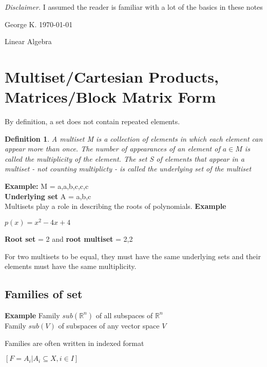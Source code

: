 \documentclass [12pt]{article}
\newtheorem {definition}{Definition}
\begin{document}
\thispagestyle {empty}

\color {blue} 
\tableofcontents 

\emph{Disclaimer.} I assumed the reader is familiar with a lot of the basics
in these notes \color {black} \newpage {}

\noindent George K. \hfill \today 

\begin {center}
 {\large Linear Algebra} 
\end {center}
 


\section {Multiset/Cartesian Products, Matrices/Block Matrix Form} By definition,
a set does not contain repeated elements. 
\begin {definition}
 A multiset M is a collection of elements in which each element can appear
more than once. The number of appearances of an element of $a\in M$ is called
the multiplicity of the element. The set S of elements that appear in a
multiset - not counting multiplicty - is called the underlying set of the
multiset 
\end {definition}
 

\textbf{Example:} M = {a,a,b,c,c,c}\\
\textbf{Underlying set} A = {a,b,c}\\

Multisets play a role in describing the roots of polynomials. \textbf{Example}

\(p(x)=x^{2}-4x+4\) 

\textbf{Root set} = {2} and \textbf{root multiset} = {2,2} 

For two multisets to be equal, they must have the same underlying sets and
their elements must have the same multiplicity. 


\subsection {Families of set} 

\textbf{Example} Family $sub({\mathbb{R}}^n)$ of all subspaces of ${\mathbb{R}}^n$\\
Family $sub(V)$ of subspaces of any vector space $V$ 

Families are often written in indexed format 

\([F={A_i|A_i\subseteq X,i\in I}]\) 
\end{document}
